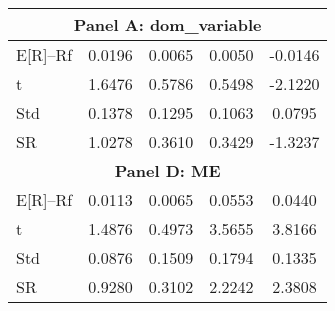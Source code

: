 \begin{table}[ht]
\begin{tabular}{lcccc}
\multicolumn{5}{c}{\textbf{Panel A: {dom_variable}}} \\
\midrule
E[R]--Rf & 0.0196 & 0.0065 & 0.0050 & -0.0146 \\
t & 1.6476 & 0.5786 & 0.5498 & -2.1220 \\
Std & 0.1378 & 0.1295 & 0.1063 & 0.0795 \\
SR & 1.0278 & 0.3610 & 0.3429 & -1.3237 \\
\midrule

\multicolumn{5}{c}{\textbf{Panel D: ME}} \\
\midrule
E[R]--Rf & 0.0113 & 0.0065 & 0.0553 & 0.0440 \\
t & 1.4876 & 0.4973 & 3.5655 & 3.8166 \\
Std & 0.0876 & 0.1509 & 0.1794 & 0.1335 \\
SR & 0.9280 & 0.3102 & 2.2242 & 2.3808 \\
\bottomrule
\end{tabular}
\end{table}
